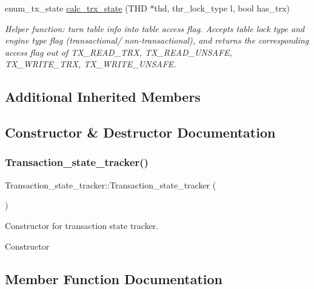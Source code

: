 \begin{DoxyCompactItemize}
enum\+\_\+tx\+\_\+state \mbox{\hyperlink{classTransaction__state__tracker_a919e7753e41fce01958c48146ff6eacb}{calc\+\_\+trx\+\_\+state}} (T\+HD $\ast$thd, thr\+\_\+lock\+\_\+type l, bool has\+\_\+trx)
\begin{DoxyCompactList}\small\item\em Helper function\+: turn table info into table access flag. Accepts table lock type and engine type flag (transactional/ non-\/transactional), and returns the corresponding access flag out of T\+X\+\_\+\+R\+E\+A\+D\+\_\+\+T\+RX, T\+X\+\_\+\+R\+E\+A\+D\+\_\+\+U\+N\+S\+A\+FE, T\+X\+\_\+\+W\+R\+I\+T\+E\+\_\+\+T\+RX, T\+X\+\_\+\+W\+R\+I\+T\+E\+\_\+\+U\+N\+S\+A\+FE. \end{DoxyCompactList}\end{DoxyCompactItemize}
\subsection*{Additional Inherited Members}


\subsection{Constructor \& Destructor Documentation}
\mbox{\label{classTransaction__state__tracker_a121b121c5020591ab173dd5735e0c261}} 
\subsubsection{\texorpdfstring{Transaction\+\_\+state\+\_\+tracker()}{Transaction\_state\_tracker()}}
{\footnotesize\ttfamily Transaction\+\_\+state\+\_\+tracker\+::\+Transaction\+\_\+state\+\_\+tracker (\begin{DoxyParamCaption}{ }\end{DoxyParamCaption})}



Constructor for transaction state tracker. 

Constructor 

\subsection{Member Function Documentation}
\mbox{\label{classTransaction__state__tracker_a40392c989a5a9f32826f07bcb14c11b2}} 
